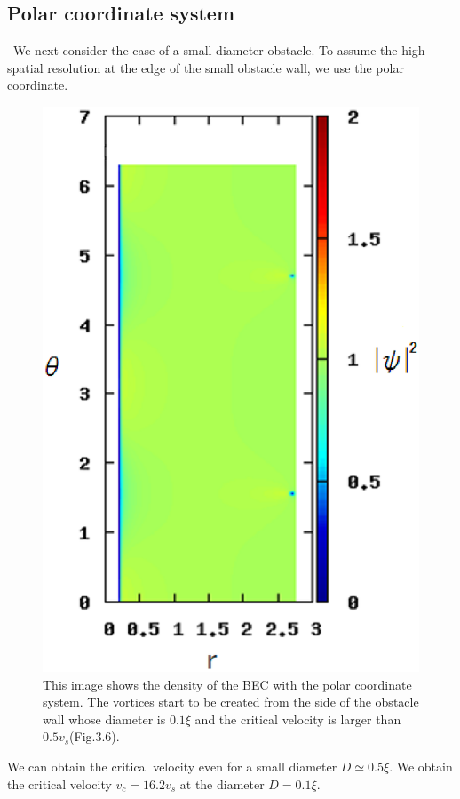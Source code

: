 \documentclass[12pt,a4paper]{report}
\begin{document}
\subsection{Polar coordinate system}
\ We next consider the case of a small diameter obstacle.
To assume the high spatial resolution at the edge of the small obstacle wall,
we use the polar coordinate.
\begin{figure}[htbp]\begin{center}
\includegraphics[scale=0.7,keepaspectratio]{3-6.eps}
\caption{
This image shows the density of the BEC with the polar coordinate system.
The vortices start to be created from the side of the obstacle wall whose diameter is $0.1 \xi$
and the critical velocity is larger than $0.5v_s$(Fig.3.6).
}
\label{FIG:3-6}
\end{center}\end{figure}
We can obtain the critical velocity even for a small diameter $D \simeq 0.5 \xi$.
We obtain the critical velocity $v_c = 16.2 v_s$ at the diameter $D = 0.1 \xi$.
\end{document}
